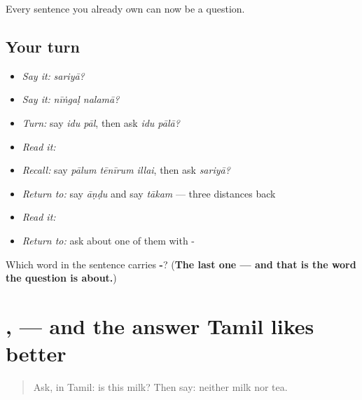 \begin{grammarlens}[title={What you've built}]
Every sentence you already own can now be a question.
\end{grammarlens}

\subsection*{Your turn}
\begin{itemize}
\raggedright
  \item \emph{Say it:} \emph{sariyā?}
  \item \emph{Say it:} \emph{nīṅgaḷ nalamā?}
  \item \emph{Turn:} say \emph{idu pāl}, then ask \emph{idu pālā?}
  \item \emph{Read it:} \textbf{}
  \item \emph{Recall:} say \emph{pālum tēnīrum illai}, then ask \emph{sariyā?}
  \item \emph{Return to:} say \emph{āṇḍu} and say \emph{tākam} — three distances back
  \item \emph{Read it:} \textbf{}
  \item \emph{Return to:} ask about one of them with -
\end{itemize}

\begin{tcolorbox}[breakable,colback=teal!4,colframe=teal!35!black,title={Before you move on}]
Which word in the sentence carries \textbf{-}? (\textbf{The last one — and that is the word the question is about.})
\end{tcolorbox}
\section[\texorpdfstring{\ta{ஆம்} / \ta{இல்லை} (ām / illai)}{ஆம் / இல்லை (ām / illai)}]{,  — and the answer Tamil likes better}

\label{lesson:TA-C75-answering}



\begin{quote}
Ask, in Tamil: is this milk? Then say: neither milk nor tea.
\end{quote}

